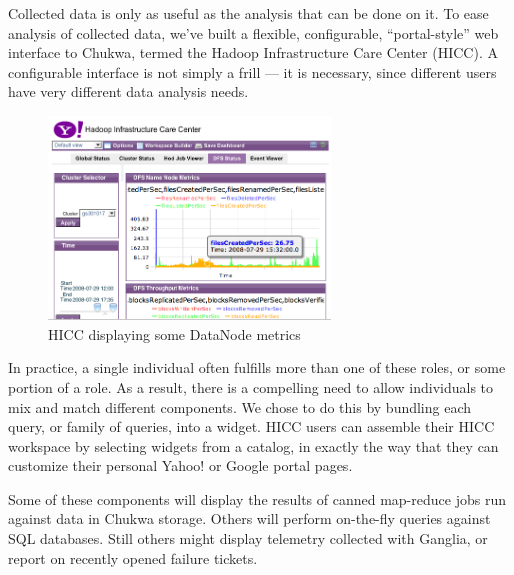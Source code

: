 \documentclass[letterpaper,twocolumn,10pt]{article}
\begin{document}
Collected data is only as useful as the analysis that can be done on it.  To ease analysis of collected data, we've built a flexible, configurable, ``portal-style'' web interface to Chukwa, termed the Hadoop Infrastructure Care Center (HICC). A configurable interface is not simply a frill --- it is necessary, since different users have very different data analysis needs.

\begin{figure}
\includegraphics[width=75mm]{hicc_in_action2.png}
\caption{HICC displaying some DataNode metrics}
\end{figure}


In practice, a single individual often fulfills more than one of these roles, or some portion of a role. As a result, there is a compelling need to allow individuals to mix and match different components. We chose to do this by bundling each query, or family of queries, into a widget. HICC users can assemble their HICC workspace by selecting widgets from a catalog, in exactly the way that they can customize their personal Yahoo! or Google portal pages.

Some of these components will display the results of canned map-reduce jobs run against data in  Chukwa storage.  Others will perform on-the-fly queries against SQL databases.    Still others might display telemetry collected with Ganglia, or report on recently opened failure tickets.  


\end{document}
